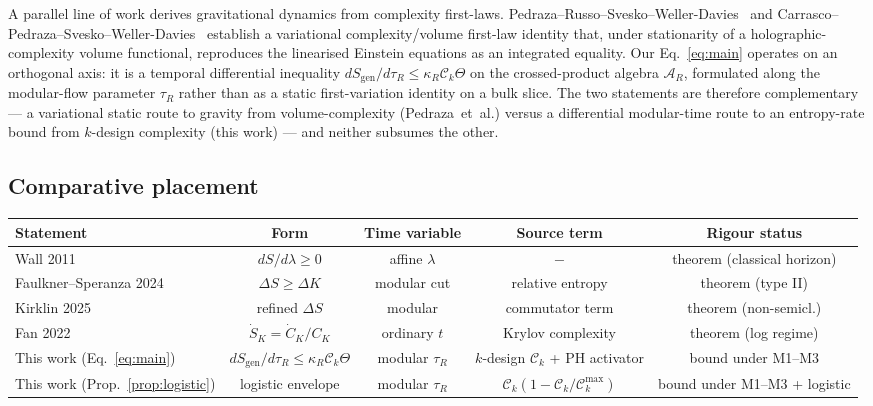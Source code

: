 \documentclass[aps,prd,superscriptaddress,nofootinbib,floatfix,10pt]{revtex4-2}
\theoremstyle{remark}
\newcommand{\Sgen}{S_{\mathrm{gen}}}
\newcommand{\tauR}{\tau_{R}}
\newcommand{\kR}{\kappa_{R}}
\newcommand{\Ck}{\mathcal{C}_{k}}
\newcommand{\AR}{\mathcal{A}_{R}}
\begin{document}
A parallel line of work derives gravitational dynamics from complexity
first-laws. Pedraza--Russo--Svesko--Weller-Davies~\cite{Pedraza2022Threads}
and Carrasco--Pedraza--Svesko--Weller-Davies~\cite{Carrasco2023} establish
a variational complexity/volume first-law identity that, under
stationarity of a holographic-complexity volume functional, reproduces the
linearised Einstein equations as an integrated equality. Our
Eq.~\eqref{eq:main} operates on an orthogonal axis: it is a temporal
differential inequality $d\Sgen/d\tauR \le \kR \Ck \Theta$ on the
crossed-product algebra $\AR$, formulated along the modular-flow
parameter $\tauR$ rather than as a static first-variation identity on a
bulk slice. The two statements are therefore complementary --- a
variational static route to gravity from volume-complexity
(Pedraza~et~al.) versus a differential modular-time route to an
entropy-rate bound from $k$-design complexity (this work) --- and neither
subsumes the other.

\subsection{Comparative placement}
\label{sec:comparative}

\begin{center}
\small
\begin{tabular}{lcccc}
\hline
Statement & Form & Time variable & Source term & Rigour status \\
\hline
Wall 2011~\cite{Wall2011}            & $dS/d\lambda\ge 0$     & affine $\lambda$ & $-$               & theorem (classical horizon) \\
Faulkner--Speranza 2024~\cite{FaulknerSperanza2024}
                                     & $\Delta S\ge\Delta K$   & modular cut      & relative entropy  & theorem (type II) \\
Kirklin 2025~\cite{Kirklin2025}      & refined $\Delta S$      & modular          & commutator term   & theorem (non-semicl.) \\
Fan 2022~\cite{Fan2022}              & $\dot S_{K}=\dot C_{K}/C_{K}$ & ordinary $t$   & Krylov complexity & theorem (log regime) \\
This work (Eq.~\ref{eq:main})        & $d\Sgen/d\tauR\le\kR\Ck\Theta$ & modular $\tauR$ & $k$-design $\Ck$ + PH activator & bound under M1--M3 \\
This work (Prop.~\ref{prop:logistic})
                                     & logistic envelope       & modular $\tauR$  & $\Ck(1-\Ck/\Ck^{\max})$ & bound under M1--M3 + logistic \\
\hline
\end{tabular}
\end{center}
\end{document}
